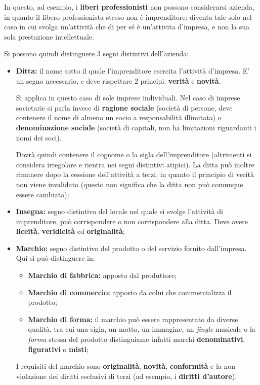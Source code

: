 \documentclass[a4paper,11pt]{article}
\begin{document}
In questo, ad esempio, i \textbf{liberi professionisti} non possono considerarsi azienda, in quanto il libero professionista stesso non è imprenditore: diventa tale solo nel caso in cui svolga un'attività che di per sé è un'attivita d'impresa, e non la sua sola prestazione intellettuale.

Si possono quindi distinguere 3 segni distintivi dell'azienda:
\begin{itemize}
	\item \textbf{Ditta:} il nome sotto il quale l'imprenditore esercita l'attività d'impresa.
		E' un segno necessario, e deve rispettare 2 principi: \textbf{verità} e \textbf{novità}. 
		
		Si applica in questo caso di sole imprese individuali.
		Nel caso di imprese societarie si parla invece di \textbf{ragione sociale} (società di persone, deve contenere il nome di almeno un socio a responsabilità illimitata) o \textbf{denominazione sociale} (società di capitali, non ha limitazioni riguardanti i nomi dei soci).

		Dovrà quindi contenere il cognome o la sigla dell'imprenditore (altrimenti si considera irregolare e rientra nei segni distintivi atipici).
		La ditta può inoltre rimanere dopo la cessione dell'attività a terzi, in quanto il principio di verità non viene invalidato (questo non significa che la ditta non può comunque essere cambiata);

	\item \textbf{Insegna:} segno distintivo del locale nel quale si svolge l'attività di imprenditore, può corrispondere o non corrispondere alla ditta. Deve avere \textbf{liceità}, \textbf{veridicità} ed \textbf{originalità};

	\item \textbf{Marchio:} segno distintivo del prodotto o del servizio fornito dall'impresa. Qui si può distinguere in:
		\begin{itemize}
			\item \textbf{Marchio di fabbrica:} apposto dal produttore;
			\item \textbf{Marchio di commercio:} apposto da colui che commercializza il prodotto;
			\item \textbf{Marchio di forma:} il marchio può essere rappresentato da diverse qualità, tra cui una sigla, un motto, un immagine, un \textit{jingle} musicale o la \textit{forma} stessa del prodotto distinguiamo infatti marchi \textbf{denominativi}, \textbf{figurativi} o \textbf{misti};
		\end{itemize}
		I requisiti del marchio sono \textbf{originalità}, \textbf{novità}, \textbf{conformità} e la non violazione dei diritti esclusivi di terzi (ad esempio, i \textbf{diritti d'autore}).


\end{itemize}
\end{document}
